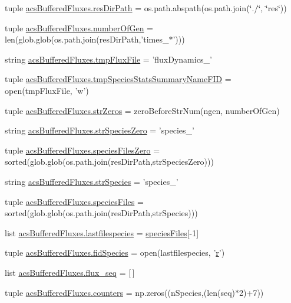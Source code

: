 \begin{DoxyCompactItemize}
\item 
tuple \hyperlink{a00092_abc625ab1aeed5741a02bbaccfbee5c06}{acs\-Buffered\-Fluxes.\-res\-Dir\-Path} = os.\-path.\-abspath(os.\-path.\-join(\char`\"{}./\char`\"{}, \char`\"{}res\char`\"{}))
\item 
tuple \hyperlink{a00092_acd3059fa3a61438f739193dc80f23b80}{acs\-Buffered\-Fluxes.\-number\-Of\-Gen} = len(glob.\-glob(os.\-path.\-join(res\-Dir\-Path,'times\-\_\-$\ast$')))
\item 
string \hyperlink{a00092_a170166907641e54151f8d83d51420165}{acs\-Buffered\-Fluxes.\-tmp\-Flux\-File} = 'flux\-Dynamics\-\_\-'
\item 
tuple \hyperlink{a00092_a0b5b14621851cbf162c61aa936ca5f2d}{acs\-Buffered\-Fluxes.\-tmp\-Species\-Stats\-Summary\-Name\-F\-I\-D} = open(tmp\-Flux\-File, 'w')
\item 
tuple \hyperlink{a00092_abfa8fbc48a0ad5b6dff6914d6052b2b6}{acs\-Buffered\-Fluxes.\-str\-Zeros} = zero\-Before\-Str\-Num(ngen, number\-Of\-Gen)
\item 
string \hyperlink{a00092_a658920d97b6df23e672e290d362033b4}{acs\-Buffered\-Fluxes.\-str\-Species\-Zero} = 'species\-\_\-'
\item 
tuple \hyperlink{a00092_a8c18127c32adcc1a3403749a047270e5}{acs\-Buffered\-Fluxes.\-species\-Files\-Zero} = sorted(glob.\-glob(os.\-path.\-join(res\-Dir\-Path,str\-Species\-Zero)))
\item 
string \hyperlink{a00092_a36518d8de93502466a6d4b2e62eb7734}{acs\-Buffered\-Fluxes.\-str\-Species} = 'species\-\_\-'
\item 
tuple \hyperlink{a00092_ae41c9dafcdeb581e70eeb889d16c6551}{acs\-Buffered\-Fluxes.\-species\-Files} = sorted(glob.\-glob(os.\-path.\-join(res\-Dir\-Path,str\-Species)))
\item 
list \hyperlink{a00092_a887b4124ed717643d4e79b6d9597109f}{acs\-Buffered\-Fluxes.\-lastfilespecies} = \hyperlink{a00022_af5703745c2c2a6af7f62da460994d9c2}{species\-Files}\mbox{[}-\/1\mbox{]}
\item 
tuple \hyperlink{a00092_ad38778cd180f00344e8a8d68511f56fd}{acs\-Buffered\-Fluxes.\-fid\-Species} = open(lastfilespecies, '\hyperlink{a00025_ac862e7284527eb913b1351c8bfb8e079}{r}')
\item 
list \hyperlink{a00092_a99cfaccf97d11133896704acd137057d}{acs\-Buffered\-Fluxes.\-flux\-\_\-seq} = \mbox{[}$\,$\mbox{]}
\item 
tuple \hyperlink{a00092_ab6476d4caeb73c29cf068374a1c8285d}{acs\-Buffered\-Fluxes.\-counters} = np.\-zeros((n\-Species,(len(seq)$\ast$2)+7))

\end{DoxyCompactItemize}
